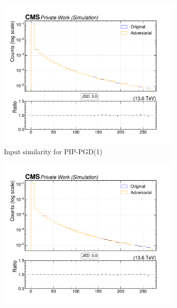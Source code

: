 \begin{figure}[htbp]
  \centering
  \begin{subfigure}[t]{0.32\textwidth}
    \includegraphics[width=\linewidth]{media/output/features/compare/combined_it_1/cmp_vtx_arr_sv_dxysig.pdf}
    \caption*{Input similarity for PIP-PGD(1)}
  \end{subfigure}\hfill
  \begin{subfigure}[t]{0.32\textwidth}
    \includegraphics[width=\linewidth]{media/output/features/compare/combined_it_2/cmp_vtx_arr_sv_dxysig.pdf}

\end{subfigure}
\end{figure}

